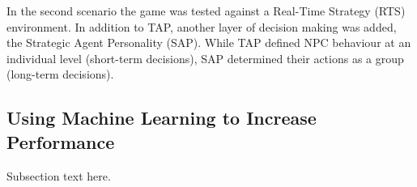\vspace{2mm}
In the second scenario the game was tested against a Real-Time Strategy (RTS) environment. In addition to TAP, another layer of decision making was added, the Strategic Agent Personality (SAP). While TAP defined NPC behaviour at an individual level (short-term decisions), SAP determined their actions as a group (long-term decisions).

\subsection{Using Machine Learning to Increase Performance}
Subsection text here.
\vspace{2mm}